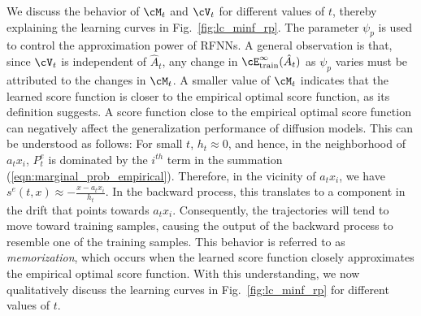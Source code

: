  We discuss the behavior of $\cM_t$ and $\cV_t$ for different values of $t$, thereby explaining the learning curves in Fig.~\ref{fig:lc_minf_rp}. The parameter $\psi_p$ is used to control the approximation power of RFNNs. A general observation is that, since $\cV_t$ is independent of $\hat{A}_t$, any change in $\cE^\infty_{\text{train}}(\hat{A}_t)$ as $\psi_p$ varies must be attributed to the changes in $\cM_t$. A smaller value of $\cM_t$ indicates that the learned score function is closer to the empirical optimal score function, as its definition suggests. A score function close to the empirical optimal score function can negatively affect the generalization performance of diffusion models. This can be understood as follows: 
 For small $t$, $h_t\approx 0$, and hence, in the neighborhood of $a_tx_i$, $P_t^e$ is dominated by the $i^{th}$ term in the summation (\ref{eqn:marginal_prob_empirical}). Therefore, in the vicinity of $a_tx_i$, we have $s^e(t,x)\approx -\frac{x-a_tx_i}{h_t}$. In the backward process, this translates to a component in the drift that points towards $a_tx_i$. Consequently, the trajectories will tend to move toward training samples, causing the output of the backward process to resemble one of the training samples. This behavior is referred to as \textit{memorization}, which occurs when the learned score function closely approximates the empirical optimal score function. With this understanding, we now qualitatively discuss the learning curves in Fig.~\ref{fig:lc_minf_rp} for different values of $t$.
